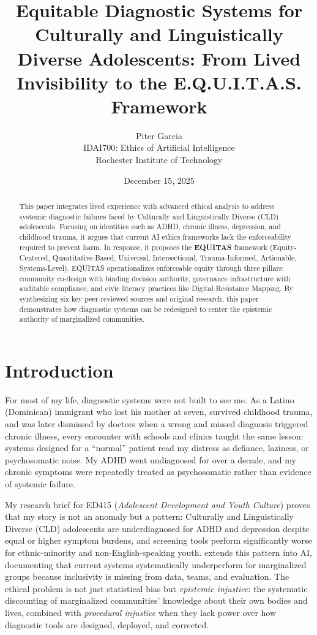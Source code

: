 \documentclass[12pt, letterpaper]{article}
\title{\textbf{Equitable Diagnostic Systems for Culturally and Linguistically Diverse Adolescents: From Lived Invisibility to the E.Q.U.I.T.A.S. Framework}}
\author{Piter Garcia \\ IDAI700: Ethics of Artificial Intelligence \\ Rochester Institute of Technology}
\date{December 15, 2025}
\begin{document}
\maketitle

\begin{abstract}
\noindent This paper integrates lived experience with advanced ethical analysis to address systemic diagnostic failures faced by Culturally and Linguistically Diverse (CLD) adolescents. Focusing on identities such as ADHD, chronic illness, depression, and childhood trauma, it argues that current AI ethics frameworks lack the enforceability required to prevent harm. In response, it proposes the \textbf{EQUITAS} framework (Equity-Centered, Quantitative-Based, Universal, Intersectional, Trauma-Informed, Actionable, Systems-Level). EQUITAS operationalizes enforceable equity through three pillars: community co-design with binding decision authority, governance infrastructure with auditable compliance, and civic literacy practices like Digital Resistance Mapping. By synthesizing six key peer-reviewed sources and original research, this paper demonstrates how diagnostic systems can be redesigned to center the epistemic authority of marginalized communities.
\end{abstract}

\doublespacing

\section{Introduction}

For most of my life, diagnostic systems were not built to see me. As a Latino (Dominican) immigrant who lost his mother at seven, survived childhood trauma, and was later dismissed by doctors when a wrong and missed diagnosis triggered chronic illness, every encounter with schools and clinics taught the same lesson: systems designed for a ``normal'' patient read my distress as defiance, laziness, or psychosomatic noise. My ADHD went undiagnosed for over a decade, and my chronic symptoms were repeatedly treated as psychosomatic rather than evidence of systemic failure.

My research brief for ED415 (\textit{Adolescent Development and Youth Culture}) proves that my story is not an anomaly but a pattern: Culturally and Linguistically Diverse (CLD) adolescents are underdiagnosed for ADHD and depression despite equal or higher symptom burdens, and screening tools perform significantly worse for ethnic-minority and non-English-speaking youth. \cite{marko2025} extends this pattern into AI, documenting that current systems systematically underperform for marginalized groups because inclusivity is missing from data, teams, and evaluation. The ethical problem is not just statistical bias but \textit{epistemic injustice}: the systematic discounting of marginalized communities' knowledge about their own bodies and lives, combined with \textit{procedural injustice} when they lack power over how diagnostic tools are designed, deployed, and corrected.
\end{document}
